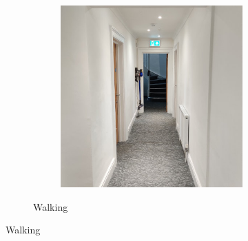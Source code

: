 \begin{figure}[p]
\begin{subfigure}[b]{\textwidth}
\begin{subfigure}[b]{0.32\textwidth}
        \end{subfigure}
        \hfill
        \begin{subfigure}[b]{0.32\textwidth}
            \centering
            \includegraphics[width=\textwidth]{content/3-Methods/enviroments/flat_3_modified.jpg}
        \end{subfigure}
        \caption{Walking}
        \label{fig:methods-flat-example}
    \end{subfigure}
    \newline


\end{figure}
